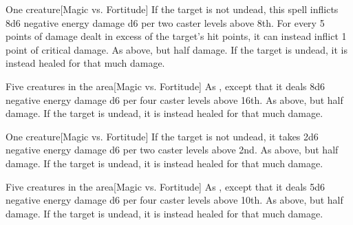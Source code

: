 \spellrng{\rngclose}
\begin{spelltarget}{One creature}[Magic vs. Fortitude]
    \spellsuccess If the target is not undead, this spell inflicts 8d6 negative energy damage \add d6 per two caster levels above 8th. For every 5 points of damage dealt in excess of the target's hit points, it can instead inflict 1 point of critical damage.
    \spellfailure As above, but half damage.
    \spelleffect If the target is undead, it is instead healed for that much damage.
\end{spelltarget}

\begin{spelltargets}{Five creatures in the area}[Magic vs. Fortitude]
    \spellsuccess As , except that it deals 8d6 negative energy damage \add d6 per four caster levels above 16th.
    \spellfailure As above, but half damage.
    \spelleffect If the target is undead, it is instead healed for that much damage.
\end{spelltargets}

\spellrng{\rngclose}
\begin{spelltarget}{One creature}[Magic vs. Fortitude]
    \spellsuccess If the target is not undead, it takes 2d6 negative energy damage \add d6 per two caster levels above 2nd.
    \spellfailure As above, but half damage.
    \spelleffect If the target is undead, it is instead healed for that much damage.
\end{spelltarget}

\begin{spelltargets}{Five creatures in the area}[Magic vs. Fortitude]
    \spellsuccess As , except that it deals 5d6 negative energy damage \add d6 per four caster levels above 10th.
    \spellfailure As above, but half damage.
    \spelleffect If the target is undead, it is instead healed for that much damage.
\end{spelltargets}

